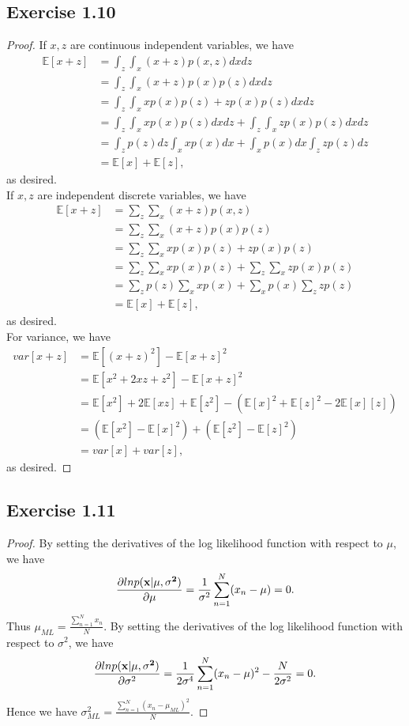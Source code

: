 \documentclass[11pt]{article}
\theoremstyle{definition}
\newcommand{\E}{\mathbb{E}}
\begin{document}
\subsection{Exercise 1.10}
\begin{proof}
If $x, z$ are continuous independent variables, we have
\begin{align*}
\E[x+z] &= \int_z\int_x (x+z)p(x,z)dxdz\\
&= \int_z\int_x (x+z)p(x)p(z)dxdz\\
&= \int_z\int_x xp(x)p(z) + zp(x)p(z)dxdz\\
&= \int_z\int_x xp(x)p(z)dxdz + \int_z\int_x zp(x)p(z)dxdz\\
&= \int_z p(z)dz\int_x xp(x)dx + \int_x p(x)dx\int_z zp(z)dz\\
&= \E[x] + \E[z],
\end{align*}
as desired.\\
If $x, z$ are independent discrete variables, we have
\begin{align*}
\E[x+z] &= \sum_z\sum_x (x+z)p(x,z)\\
&= \sum_z\sum_x (x+z)p(x)p(z)\\
&= \sum_z\sum_x xp(x)p(z) + zp(x)p(z)\\
&= \sum_z\sum_x xp(x)p(z) + \sum_z\sum_x zp(x)p(z)\\
&= \sum_z p(z)\sum_x xp(x) + \sum_x p(x)\sum_z zp(z)\\
&= \E[x] + \E[z],
\end{align*}
as desired.\\
For variance, we have
\begin{align*}
var[x+z] &= \E[(x+z)^2] - \E[x+z]^2\\
&= \E[x^2 + 2xz + z^2] - \E[x+z]^2 \\
&= \E[x^2] + 2\E[xz] + \E[z^2] - (\E[x]^2 + \E[z]^2 -2\E[x][z]) \\
&= (\E[x^2] - \E[x]^2) + (\E[z^2] - \E[z]^2) \\
&= var[x] + var[z],
\end{align*}
as desired.
\end{proof}

\subsection{Exercise 1.11}
\begin{proof}
By setting the derivatives of the log likelihood function with respect to $\mu$, we have
\begin{align*}
\frac{\partial ln p(\bf x | \mu, \sigma^2)}{\partial \mu} = \frac{1}{\sigma^2}\sum^N_{n=1}(x_n-\mu) = 0.
\end{align*}
Thus $\mu_{ML} = \frac{\sum^N_{n=1}x_n}{N}$. By setting the derivatives of the log likelihood function with respect to $\sigma^2$, we have
\begin{align*}
\frac{\partial ln p(\bf x | \mu, \sigma^2)}{\partial \sigma^2} = \frac{1}{2\sigma^4}\sum^N_{n=1}(x_n-\mu)^2 - \frac{N}{2\sigma^2} = 0.
\end{align*}
Hence we have $\sigma^2_{ML} = \frac{\sum^N_{n=1}(x_n-\mu_{ML})^2}{N}$.
\end{proof} 
\end{document}
